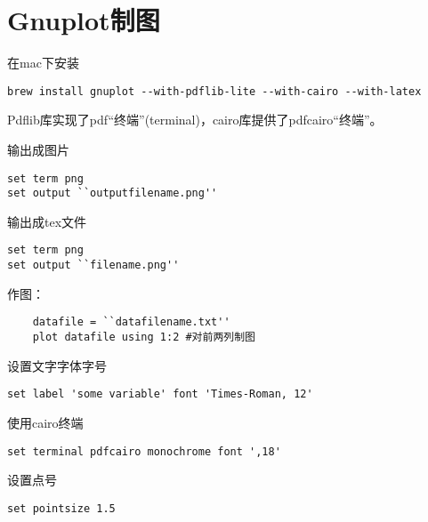 \section{Gnuplot制图}
在mac下安装
\begin{lstlisting}
brew install gnuplot --with-pdflib-lite --with-cairo --with-latex
\end{lstlisting}
Pdflib库实现了pdf“终端”(terminal)，cairo库提供了pdfcairo“终端”。

输出成图片

\begin{lstlisting}
set term png
set output ``outputfilename.png''
\end{lstlisting}


输出成tex文件
\begin{lstlisting}
set term png
set output ``filename.png''
\end{lstlisting}


作图：
\begin{lstlisting}
    datafile = ``datafilename.txt''
    plot datafile using 1:2 #对前两列制图
\end{lstlisting}

设置文字字体字号
\begin{lstlisting}
set label 'some variable' font 'Times-Roman, 12'
\end{lstlisting}

使用cairo终端
\begin{lstlisting}
set terminal pdfcairo monochrome font ',18'
\end{lstlisting}

设置点号
\begin{lstlisting}
set pointsize 1.5
\end{lstlisting}
